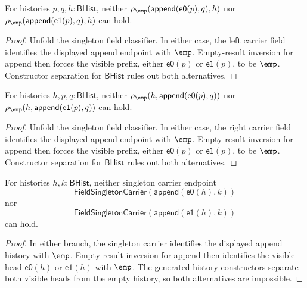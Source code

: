 \begin{theorem}
\label{thm:field-singleton-classifier-append-visible-prefix-absurd}
For histories $p,q,h:\mathsf{BHist}$, neither
$\rho_{\emp}(\mathsf{append}(\mathsf{e0}(p),q),h)$ nor
$\rho_{\emp}(\mathsf{append}(\mathsf{e1}(p),q),h)$ can hold.
\end{theorem}
\begin{proof}
Unfold the singleton field classifier. In either case, the left carrier field
identifies the displayed append endpoint with $\emp$. Empty-result inversion
for append then forces the visible prefix, either $\mathsf{e0}(p)$ or
$\mathsf{e1}(p)$, to be $\emp$. Constructor separation for
$\mathsf{BHist}$ rules out both alternatives.
\end{proof}

\begin{theorem}
\label{thm:field-singleton-classifier-append-visible-right-prefix-absurd}
For histories $h,p,q:\mathsf{BHist}$, neither
$\rho_{\emp}(h,\mathsf{append}(\mathsf{e0}(p),q))$ nor
$\rho_{\emp}(h,\mathsf{append}(\mathsf{e1}(p),q))$ can hold.
\end{theorem}
\begin{proof}
Unfold the singleton field classifier. In either case, the right carrier field
identifies the displayed append endpoint with $\emp$. Empty-result inversion
for append then forces the visible prefix, either $\mathsf{e0}(p)$ or
$\mathsf{e1}(p)$, to be $\emp$. Constructor separation for $\mathsf{BHist}$
rules out both alternatives.
\end{proof}

\begin{theorem}
\label{thm:field-singleton-carrier-append-visible-head-absurd}
For histories $h,k:\mathsf{BHist}$, neither singleton carrier endpoint
$$
\mathsf{FieldSingletonCarrier}(\mathsf{append}(\mathsf{e0}(h),k))
$$
nor
$$
\mathsf{FieldSingletonCarrier}(\mathsf{append}(\mathsf{e1}(h),k))
$$
can hold.
\end{theorem}
\begin{proof}
In either branch, the singleton carrier identifies the displayed append
history with $\emp$. Empty-result inversion for append then identifies the
visible head $\mathsf{e0}(h)$ or $\mathsf{e1}(h)$ with $\emp$. The generated
history constructors separate both visible heads from the empty history, so
both alternatives are impossible.
\end{proof}

